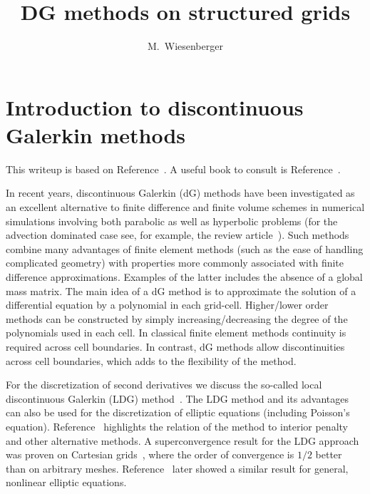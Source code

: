 




\title{DG methods on structured grids}
\author{M.~Wiesenberger}

\section{ Introduction to discontinuous Galerkin methods} \label{sec:discretization}
This writeup is based on Reference~\cite{WiesenbergerPhD}. A useful book to consult
is Reference~\cite{NodalDG}.

In recent years, discontinuous Galerkin (dG) methods have been investigated 
as an excellent alternative to finite difference and finite volume schemes 
in numerical simulations involving both parabolic as well as hyperbolic problems 
(for the advection dominated case see, for example, the review article~\cite{Cockburn2001runge}). 
Such methods combine many advantages of finite element methods (such as the ease of handling 
complicated geometry) with properties more commonly associated with 
finite difference approximations. Examples of the latter includes the absence 
of a global mass matrix. 
The main idea of a dG method is to approximate the solution 
of a differential equation by a polynomial in each grid-cell. 
Higher/lower
order methods can be constructed by simply increasing/decreasing the degree of 
the polynomials used in each cell. 
In classical finite element methods continuity is required across cell boundaries. 
In contrast, dG methods allow discontinuities across cell boundaries, which adds to the flexibility of the method.

For the discretization of second derivatives we discuss the so-called local discontinuous Galerkin (LDG) method~\cite{Cockburn1998}.
The LDG method and its advantages can also be used for the discretization of 
elliptic equations (including Poisson's equation). 
Reference~\cite{Arnold2002} highlights the relation 
of the method to interior penalty and other alternative methods. 
A superconvergence result for the 
LDG approach was proven on Cartesian grids~\cite{Cockburn2002},
where the order of convergence is $1/2$ better than on arbitrary meshes.
Reference~\cite{Yadav2013} later showed a similar result for general, nonlinear elliptic equations.

